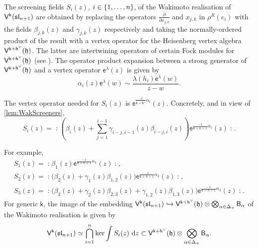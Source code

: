 \documentclass[10pt,a4paper]{amsart}
\numberwithin{equation}{section}
\newcommand{\pd}{\partial}     %
\renewcommand{\cong}{\simeq} %
\newcommand{\dd}{\mathrm{d}}   %
\newcommand{\ee}{\mathsf{e}}   %
\newcommand{\kk}{\mathsf{k}}   %
\DeclarePairedDelimiter{\brac}{\lparen}{\rparen}   %
\DeclarePairedDelimiter{\set}{\lbrace}{\rbrace}
\newcommand{\no}[1]{\mathopen{:} #1 \mathclose{:}} %
\newcommand{\alg}[1]{\mathfrak{#1}}  %
\newcommand{\VOA}[1]{\mathsf{#1}}    %
\newcommand{\SLA}[2]{\alg{#1}_{#2}}                      %
\newcommand{\slnpone}{\SLA{sl}{n+1}}
\newcommand{\cartan}{\mathfrak{h}}
\newcommand{\cox}{\mathsf{h}}                                        %
\newcommand{\dcox}{\coroot{\cox}}                                    %
\newcommand{\proots}{\Delta_+}                                       %
\newcommand{\prvec}[1]{e_{#1}}                                        %
\newcommand{\coroot}[1]{#1^{\vee}}                                   %
\newcommand{\uaffvoa}[2]{\VOA{V}^{#1}\brac{#2}}                   %
\newcommand{\bgvoa}{\VOA{B}}                                      %
\theoremstyle{plain}
\begin{document}
The screening fields $S_i(z)$, $i\in \set{1,\dots,n}$, of the Wakimoto realisation of $\uaffvoa{\kk}{\slnpone}$ are obtained by replacing the operators $\frac{\pd}{\pd x_{j,k}}$ and $x_{j,k}$ in $ \rho^R(\prvec{i})$ with the fields $\beta_{j,k}(z)$ and  $\gamma_{j,k}(z)$ respectively and taking the normally-ordered product of the result with a vertex operator for the Heisenberg vertex algebra $\uaffvoa{\kk+\dcox}{\cartan}$. The latter are intertwining operators of certain Fock modules for $\uaffvoa{\kk+\dcox}{\cartan}$ (see \cite[Sec.~5.2]{FBZ04}). The operator product expansion between a strong generator of $\uaffvoa{\kk+\dcox}{\cartan}$ and a vertex operator $\ee^{\lambda}(z)$ is given by
%
\begin{equation}
    \alpha_i(z) \ee^{\lambda}(w) \sim \frac{\lambda(h_i)\ee^{\lambda}(w)}{z-w}.
\end{equation}

The vertex operator needed for $S_i(z)$ is $\ee^{\frac{-1}{\kk+\dcox} \alpha_i}(z)$. Concretely, and in view of \cref{lem:WakScreeners},
%
\begin{equation} \label{eq:WakScreeners}
    S_i(z) = \no{\left( \beta_i(z) + \sum_{j=1}^{i-1} \gamma_{i-j,i-1}(z) \beta_{i-j,i}(z)  \right) \ee^{\frac{-1}{\kk+n+1} \alpha_i}(z) }.
\end{equation}

For example,
%
\begin{equation} \label{eq:WakScreenersExp}
\begin{gathered}
    S_1(z) = \no{\beta_1(z) \ee^{\frac{-1}{\kk+n+1} \alpha_1}(z)},\\
    S_2(z) = \no{\big(\beta_2(z)+\gamma_1(z) \beta_{1,2}(z) \big) \ee^{\frac{-1}{\kk+n+1} \alpha_2}(z)},\\
    S_3(z) = \no{\big(\beta_3(z) + \gamma_2(z) \beta_{2,3}(z) + \gamma_{1,2}(z) \beta_{1,3}(z)\big) \ee^{\frac{-1}{\kk+n+1} \alpha_3}(z)}.
\end{gathered}
\end{equation}
%
For generic $\kk$, the image of the embedding $\uaffvoa{\kk}{\slnpone} \hookrightarrow  \uaffvoa{\kk+\dcox}{\cartan} \otimes \bigotimes_{\alpha \in \proots} \bgvoa_\alpha$ of the Wakimoto realisation is given by \cite[Prop.~8.2]{Fre05Opers}
%
\begin{equation} \label{eq:WakAffScreen}
    \uaffvoa{\kk}{\slnpone} \cong \bigcap_{i=1}^n \textup{ker} \int S_i(z) \ \dd z \subset \uaffvoa{\kk+\dcox}{\cartan} \otimes \bigotimes_{\alpha \in \proots} \bgvoa_\alpha.
\end{equation}
\end{document}
